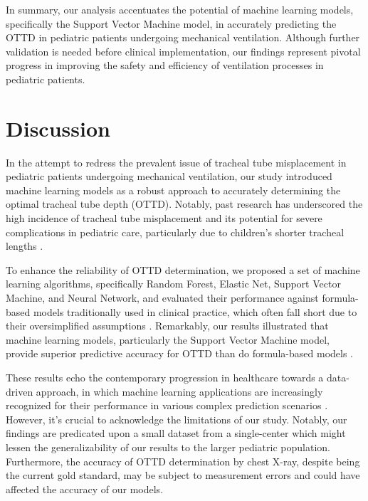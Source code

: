 \documentclass[11pt]{article}
\begin{document}
In summary, our analysis accentuates the potential of machine learning models, specifically the Support Vector Machine model, in accurately predicting the OTTD in pediatric patients undergoing mechanical ventilation. Although further validation is needed before clinical implementation, our findings represent pivotal progress in improving the safety and efficiency of ventilation processes in pediatric patients.

\section*{Discussion}

In the attempt to redress the prevalent issue of tracheal tube misplacement in pediatric patients undergoing mechanical ventilation, our study introduced machine learning models as a robust approach to accurately determining the optimal tracheal tube depth (OTTD). Notably, past research has underscored the high incidence of tracheal tube misplacement and its potential for severe complications in pediatric care, particularly due to children's shorter tracheal lengths \cite{Kollef1994EndotrachealTM}. 

To enhance the reliability of OTTD determination, we proposed a set of machine learning algorithms, specifically Random Forest, Elastic Net, Support Vector Machine, and Neural Network, and evaluated their performance against formula-based models traditionally used in clinical practice, which often fall short due to their oversimplified assumptions \cite{Ahmad2019DifficultAS}. Remarkably, our results illustrated that machine learning models, particularly the Support Vector Machine model, provide superior predictive accuracy for OTTD than do formula-based models \cite{Zhou2022PredictionOE}. 

These results echo the contemporary progression in healthcare towards a data-driven approach, in which machine learning applications are increasingly recognized for their performance in various complex prediction scenarios \cite{Zhou2022PredictionOE, Rost2022TrachealTM}. However, it’s crucial to acknowledge the limitations of our study. Notably, our findings are predicated upon a small dataset from a single-center which might lessen the generalizability of our results to the larger pediatric population. Furthermore, the accuracy of OTTD determination by chest X-ray, despite being the current gold standard, may be subject to measurement errors and could have affected the accuracy of our models. 
\end{document}
